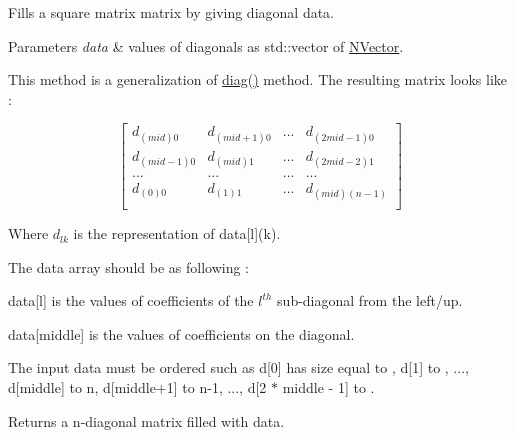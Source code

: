 Fills a square matrix matrix by giving diagonal data. 


\begin{DoxyParams}{Parameters}
{\em data} & values of diagonals as {\ttfamily std\+::vector} of {\ttfamily \mbox{\hyperlink{class_n_vector}{N\+Vector}}}.\\
\hline
\end{DoxyParams}
This method is a generalization of {\ttfamily \mbox{\hyperlink{class_n_p_matrix_ae73ef1ba99fe04c35af30adc3bfbd1dc}{diag()}}} method. The resulting matrix looks like \+:

\[ \begin{bmatrix} d_{(mid)0} & d_{(mid+1)0} & ... & d_{(2 mid-1)0} \\ d_{(mid-1)0} & d_{(mid)1} & ... & d_{(2 mid-2)1} \\ ... & ... & ... & ...\\ d_{(0)0} & d_{(1)1} & ... & d_{(mid)(n-1)} \\ \end{bmatrix} \]

Where $ d_{lk} $ is the representation of {\ttfamily data\mbox{[}l\mbox{]}(k)}.

The {\ttfamily data} array should be as following \+:
\begin{DoxyItemize}
\item {\ttfamily data\mbox{[}l\mbox{]}} is the values of coefficients of the $ l^{th} $ sub-\/diagonal from the left/up.
\item {\ttfamily data\mbox{[}middle\mbox{]}} is the values of coefficients on the diagonal.
\end{DoxyItemize}

The input data must be ordered such as {\ttfamily d\mbox{[}0\mbox{]}} has size equal to {}, {\ttfamily d\mbox{[}1\mbox{]}} to {}, ..., {\ttfamily d\mbox{[}middle\mbox{]}} to {\ttfamily n}, {\ttfamily d\mbox{[}middle+1\mbox{]}} to {\ttfamily n-\/1}, ..., {\ttfamily d\mbox{[}2 $\ast$ middle -\/ 1\mbox{]}} to {}.

\begin{DoxyReturn}{Returns}
a n-\/diagonal matrix filled with {\ttfamily data}. 
\end{DoxyReturn}
\mbox{\label{class_n_p_matrix_aa2540f387990e3db6551bd88bc5d43d9}} 
